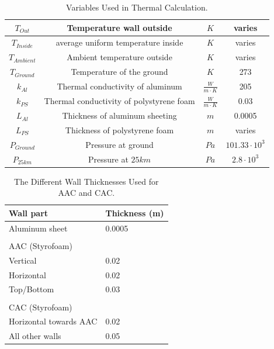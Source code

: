 \begin{table}[H]
\begin{tabular}{|c|c|c|c|}
        $T_{Out}$ & Temperature wall outside & $K$ & varies \\ \hline
        $T_{Inside}$ & average uniform temperature inside & $K$ & varies \\ \hline
        $T_{Ambient}$ & Ambient temperature outside & $K$ & varies \\ \hline
        $T_{Ground}$ & Temperature of the ground & $K$ & 273 \\ \hline
        $k_{Al}$ & Thermal conductivity of aluminum & $\frac{W}{m\cdot K}$ & 205 \\ \hline
        $k_{PS}$ & Thermal conductivity of polystyrene foam & $\frac{W}{m\cdot K}$ & 0.03 \\ \hline
        $L_{Al}$ & Thickness of aluminum sheeting & $m$ & 0.0005 \\ \hline
        $L_{PS}$ & Thickness of polystyrene foam & $m$ & varies \\ \hline
        $P_{Ground}$ & Pressure at ground & $Pa$ & $101.33 \cdot 10^3$ \\ \hline
        $P_{25km}$ & Pressure at $25 km$ & $Pa$ & $2.8 \cdot 10^3$ \\ \hline
    \end{tabular}
    \caption{Variables Used in Thermal Calculation.}
    \label{tab:thermal-variables}
\end{table}

\begin{table}[H]
\centering

\begin{tabular}{ll}
\hline
\multicolumn{1}{|l|}{\textbf{Wall part}}              & \multicolumn{1}{l|}{\textbf{Thickness (m)}} \\ \hline
\multicolumn{1}{|l|}{Aluminum sheet}         & \multicolumn{1}{l|}{0.0005}        \\ \hline
                                             &                                    \\ \cline{1-1}
\multicolumn{1}{|l|}{AAC (Styrofoam)}        &                                    \\ \hline
\multicolumn{1}{|l|}{Vertical}               & \multicolumn{1}{l|}{0.02}          \\ \hline
\multicolumn{1}{|l|}{Horizontal}             & \multicolumn{1}{l|}{0.02}          \\ \hline
\multicolumn{1}{|l|}{Top/Bottom}             & \multicolumn{1}{l|}{0.03}          \\ \hline
                                             &                                    \\ \cline{1-1}
\multicolumn{1}{|l|}{CAC (Styrofoam)}        &                                    \\ \hline
\multicolumn{1}{|l|}{Horizontal towards AAC} & \multicolumn{1}{l|}{0.02}          \\ \hline
\multicolumn{1}{|l|}{All other walls}        & \multicolumn{1}{l|}{0.05}          \\ \hline
\end{tabular}
\caption{The Different Wall Thicknesses Used for AAC and CAC.}
\label{tab:Wall-thickness-AAC-CAC}
\end{table}

